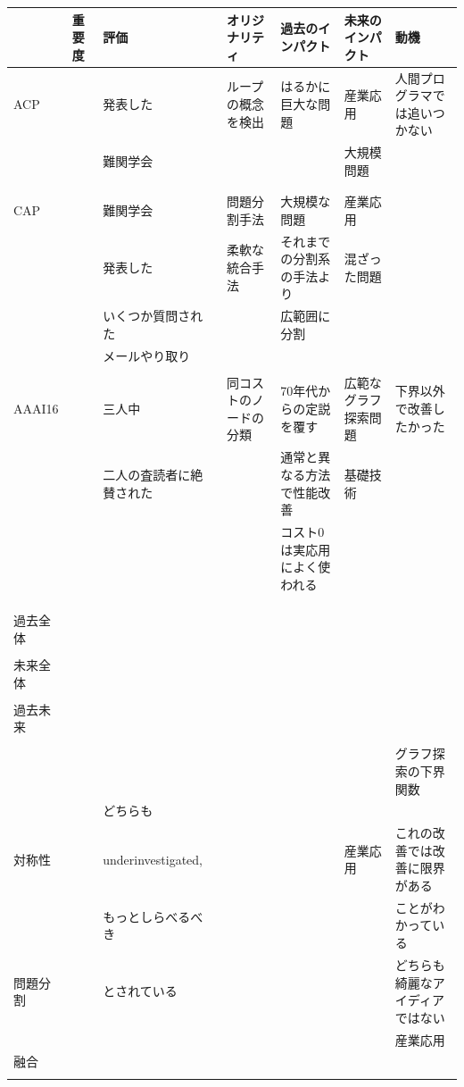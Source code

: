 \begin{center}
\begin{tabular}{lllllll}
 & 重要度 & 評価 & オリジナリティ & 過去のインパクト & 未来のインパクト & 動機\\
\hline
ACP &  & 発表した & ループの概念を検出 & はるかに巨大な問題 & 産業応用 & 人間プログラマでは追いつかない\\
 &  & 難関学会 &  &  & 大規模問題 & \\
 &  &  &  &  &  & \\
 &  &  &  &  &  & \\
CAP &  & 難関学会 & 問題分割手法 & 大規模な問題 & 産業応用 & \\
 &  & 発表した & 柔軟な統合手法 & それまでの分割系の手法より & 混ざった問題 & \\
 &  & いくつか質問された &  & 広範囲に分割 &  & \\
 &  & メールやり取り &  &  &  & \\
 &  &  &  &  &  & \\
\hline
AAAI16 &  & 三人中 & 同コストのノードの分類 & 70年代からの定説を覆す & 広範なグラフ探索問題 & 下界以外で改善したかった\\
 &  & 二人の査読者に絶賛された &  & 通常と異なる方法で性能改善 & 基礎技術 & \\
 &  &  &  & コスト0は実応用によく使われる &  & \\
 &  &  &  &  &  & \\
 &  &  &  &  &  & \\
 &  &  &  &  &  & \\
\hline
過去全体 &  &  &  &  &  & \\
 &  &  &  &  &  & \\
未来全体 &  &  &  &  &  & \\
 &  &  &  &  &  & \\
過去未来 &  &  &  &  &  & \\
 &  &  &  &  &  & \\
 &  &  &  &  &  & グラフ探索の下界関数\\
 &  & どちらも &  &  &  & \\
対称性 &  & underinvestigated, &  &  & 産業応用 & これの改善では改善に限界がある\\
 &  & もっとしらべるべき &  &  &  & ことがわかっている\\
問題分割 &  & とされている &  &  &  & どちらも綺麗なアイディアではない\\
 &  &  &  &  &  & 産業応用\\
融合 &  &  &  &  &  & \\
 &  &  &  &  &  & \\
\end{tabular}
\end{center}


